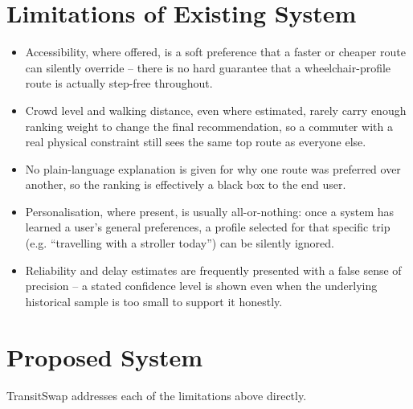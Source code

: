 \documentclass[12pt,a4paper]{report}
\begin{document}
\section{Limitations of Existing System}

\begin{itemize}[leftmargin=*]
  \item Accessibility, where offered, is a soft preference that a faster or cheaper route can
    silently override -- there is no hard guarantee that a wheelchair-profile route is actually
    step-free throughout.
  \item Crowd level and walking distance, even where estimated, rarely carry enough ranking weight
    to change the final recommendation, so a commuter with a real physical constraint still sees
    the same top route as everyone else.
  \item No plain-language explanation is given for why one route was preferred over another, so the
    ranking is effectively a black box to the end user.
  \item Personalisation, where present, is usually all-or-nothing: once a system has learned a
    user's general preferences, a profile selected for that specific trip (e.g. ``travelling with a
    stroller today'') can be silently ignored.
  \item Reliability and delay estimates are frequently presented with a false sense of precision --
    a stated confidence level is shown even when the underlying historical sample is too small to
    support it honestly.
\end{itemize}

\section{Proposed System}

TransitSwap addresses each of the limitations above directly.
\end{document}
